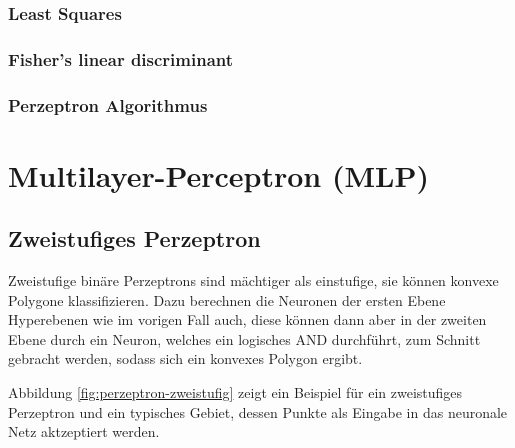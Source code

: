 \subsubsection*{Least Squares}
\subsubsection*{Fisher's linear discriminant}
\subsubsection*{Perzeptron Algorithmus}


\section*{Multilayer-Perceptron (MLP)}
\subsection*{Zweistufiges Perzeptron}
Zweistufige binäre Perzeptrons sind mächtiger als einstufige, sie können konvexe Polygone klassifizieren. Dazu berechnen die Neuronen der ersten Ebene Hyperebenen wie im vorigen Fall auch, diese können dann aber in der zweiten Ebene durch ein Neuron, welches ein logisches AND durchführt, zum Schnitt gebracht werden, sodass sich ein konvexes Polygon ergibt.

Abbildung \ref{fig:perzeptron-zweistufig} zeigt ein Beispiel für ein zweistufiges Perzeptron und ein typisches Gebiet, dessen Punkte als Eingabe in das neuronale Netz aktzeptiert werden.

